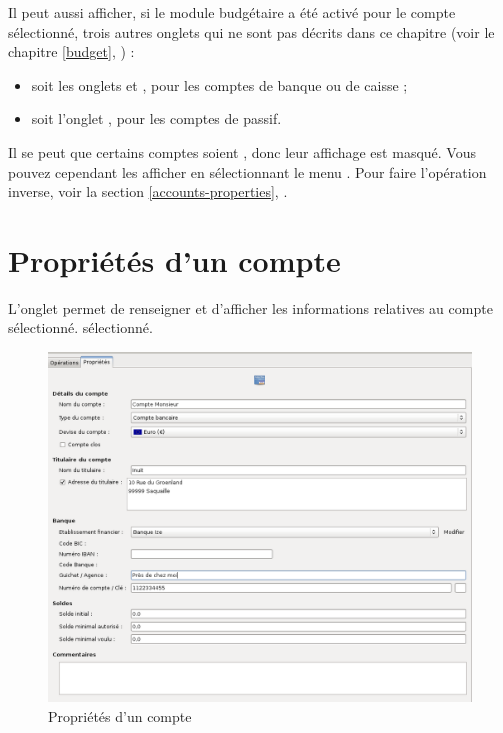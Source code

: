 Il peut aussi afficher, si le module budgétaire a été activé pour le compte sélectionné, trois autres onglets qui ne sont pas décrits dans ce chapitre (voir le chapitre \vref{budget}, ) :
\begin{itemize}
	 \item soit les onglets  et , pour les comptes de banque ou de caisse ;
	 \item soit l'onglet , pour les comptes de passif.
\end{itemize}


Il se peut que certains comptes soient , donc leur affichage est masqué. Vous pouvez cependant les afficher en sélectionnant le menu . Pour faire l'opération inverse, voir la section \vref{accounts-properties}, . 


\section{Propriétés d'un compte\label{accounts-properties}}


L'onglet  permet de renseigner et d'afficher les informations relatives au compte \ifIllustration sélectionné.
\else sélectionné.
\fi

\ifIllustration
\begin{figure}[h!]
\begin{center}
\includegraphics[scale=0.48]{image/screenshot/account_new_properties}
\end{center}
\caption{Propriétés d'un compte}
\label{account-new-properties-img}
\end{figure}
\fi

